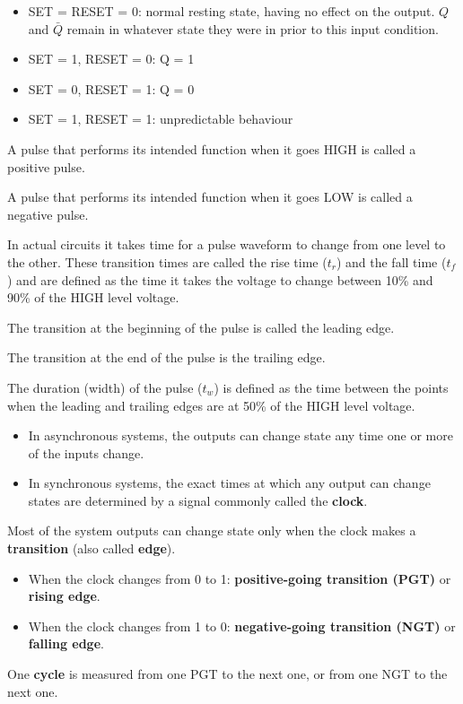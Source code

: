     \begin{itemize}
        \item SET = RESET = 0: normal resting state, having no effect on the output.
        $Q$ and $\bar{Q}$ remain in whatever state they were in prior to this input
        condition.
        \item SET = 1, RESET = 0: Q = 1
        \item SET = 0, RESET = 1: Q = 0
        \item SET = 1, RESET = 1: unpredictable behaviour
    \end{itemize}

    \par A pulse that performs its intended function when it goes HIGH is called
    a positive pulse.
    \par A pulse that performs its intended function when it goes LOW is called
    a negative pulse.
    \par In actual circuits it takes time for a pulse waveform to change from one
    level to the other. These transition times are called the rise time ($t_{r}$) and
    the fall time ($t_{f}$) and are defined as the time it takes the voltage to change
    between 10\% and 90\% of the HIGH level voltage.
    \par The transition at the beginning of the pulse is called the leading edge.
    \par The transition at the end of the pulse is the trailing edge.
    \par The duration (width) of the pulse ($t_{w}$) is defined as the time between
    the points when the leading and trailing edges are at 50\% of the HIGH level voltage.

        \begin{itemize}
            \item In asynchronous systems, the outputs can change state any time one
              or more of the inputs change.
            \item In synchronous systems, the exact times at which any output can change
              states are determined by a signal commonly called the \textbf{clock}.
        \end{itemize}

        \par Most of the system outputs can change state only when the clock makes
        a \textbf{transition} (also called \textbf{edge}).
        \begin{itemize}
            \item When the clock changes from 0 to 1: \textbf{positive-going
                transition (PGT)} or \textbf{rising edge}.
            \item When the clock changes from 1 to 0: \textbf{negative-going
                transition (NGT)} or \textbf{falling edge}.
        \end{itemize}
        \par One \textbf{cycle} is measured from one PGT to the next one, or from
        one NGT to the next one.

